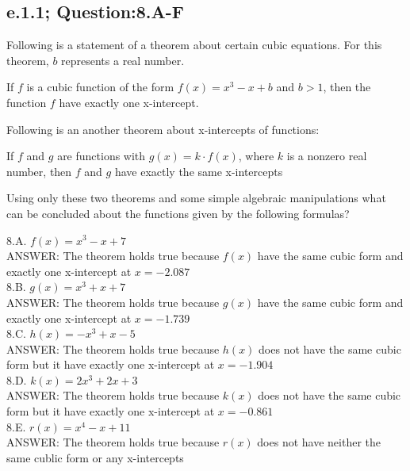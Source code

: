 \subsection{e.1.1; Question:8.A-F}
Following  is a statement of a theorem about certain cubic equations. For this theorem, $b$ represents a real number. \\
\begin{tcolorbox}
\begin{theorem}
If $f$ is a cubic function of the form $f(x) = x^3 - x + b$ and $b>1$, then the function $f$ have exactly one x-intercept.
\end{theorem}
\end{tcolorbox}

Following is an another theorem about x-intercepts of functions: 
\begin{tcolorbox}
\begin{theorem}
If $f$ and $g$ are functions with $g(x) = k \cdot f(x)$, where $k$ is a nonzero real number, then $f$ and $g$ have exactly the same x-intercepts
\end{theorem}
\end{tcolorbox}

Using only these two theorems and some simple algebraic manipulations what can be concluded about the functions given by the following formulas?

8.A. $f(x) = x^3 - x + 7$ \\
	ANSWER: The theorem holds true because $f(x)$ have the same cubic form and exactly one x-intercept at $x=-2.087$ \\

8.B. $g(x) = x^3 + x + 7$ \\
	ANSWER: The theorem holds true because $g(x)$ have the same cubic form and exactly one x-intercept at $x=-1.739$ \\

8.C. $h(x) = -x^3 + x -5$ \\
	ANSWER: The theorem holds true because $h(x)$ does not have the same cubic form but it have exactly one x-intercept at $x=-1.904$ \\

8.D. $k(x) = 2x^3 + 2x +3$ \\
	ANSWER: The theorem holds true because $k(x)$ does not have the same cubic form but it have exactly one x-intercept at $x=-0.861$ \\

8.E. $r(x) = x^4 - x + 11$ \\
	ANSWER: The theorem holds true because $r(x)$ does not have neither the same cublic form or any x-intercepts \\

